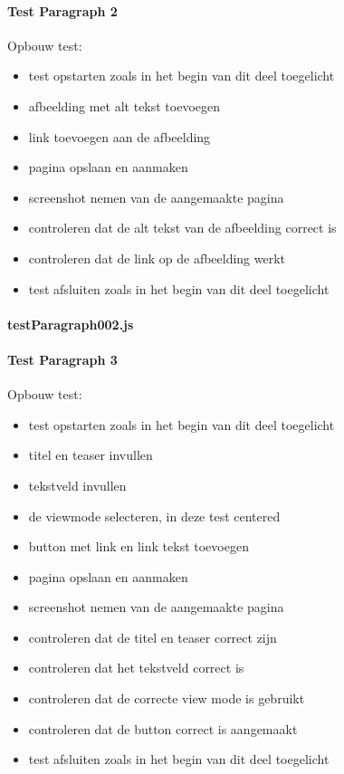 \clearpage
\paragraph{Test Paragraph 2}
\label{test2}
Opbouw test: 
\begin{itemize}
\item test opstarten zoals in het begin van dit deel toegelicht
\item afbeelding met alt tekst toevoegen
\item link toevoegen aan de afbeelding
\item pagina opslaan en aanmaken
\item screenshot nemen van de aangemaakte pagina
\item controleren dat de alt tekst van de afbeelding correct is
\item controleren dat de link op de afbeelding werkt
\item test afsluiten zoals in het begin van dit deel toegelicht
\end{itemize}
\paragraph{testParagraph002.js}


\clearpage
\paragraph{Test Paragraph 3}
\label{test3}
Opbouw test: 
\begin{itemize}
\item test opstarten zoals in het begin van dit deel toegelicht
\item titel en teaser invullen
\item tekstveld invullen
\item de viewmode selecteren, in deze test centered
\item button met link en link tekst toevoegen
\item pagina opslaan en aanmaken
\item screenshot nemen van de aangemaakte pagina
\item controleren dat de titel en teaser correct zijn
\item controleren dat het tekstveld correct is
\item controleren dat de correcte view mode is gebruikt
\item controleren dat de button correct is aangemaakt
\item test afsluiten zoals in het begin van dit deel toegelicht
\end{itemize}
